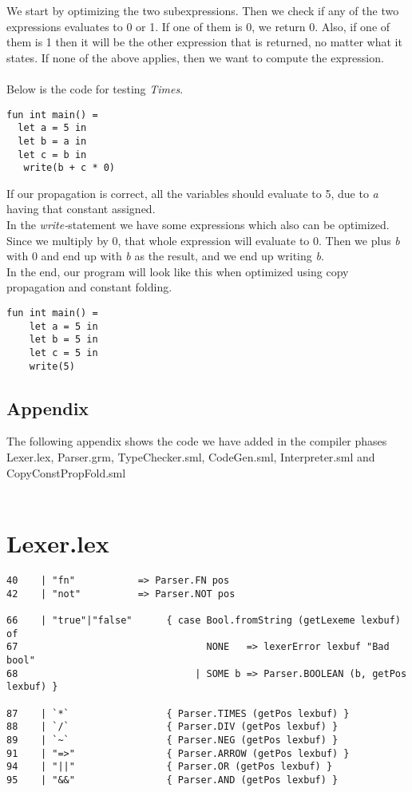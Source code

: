 \documentclass[paper=a4, fontsize=11pt]{scrartcl} %
\numberwithin{equation}{section} %
\numberwithin{figure}{section} %
\numberwithin{table}{section} %
\begin{document}
We start by optimizing the two subexpressions. Then we check if any of the two expressions evaluates to 0 or 1. If one of them is 0, we return 0. Also, if one of them is 1 then it will be the other expression that is returned, no matter what it states. If none of the above applies, then we want to compute the expression.\\\\
Below is the code for testing \textit{Times}. 
\begin{lstlisting}
fun int main() = 
  let a = 5 in
  let b = a in
  let c = b in
   write(b + c * 0)
\end{lstlisting}
If our propagation is correct, all the variables should evaluate to 5, due to \textit{a} having that constant assigned.\\
In the \textit{write-}statement we have some expressions which also can be optimized. Since we multiply by 0, that whole expression will evaluate to 0. Then we plus \textit{b} with 0 and end up with \textit{b} as the result, and we end up writing \textit{b}.\\
In the end, our program will look like this when optimized using copy propagation and constant folding.
\begin{lstlisting}
fun int main() =  
    let a = 5 in    
    let b = 5 in    
    let c = 5 in
    write(5)
\end{lstlisting}

\pagebreak

\section*{Appendix}

\appendix
The following appendix shows the code we have added in the compiler phases Lexer.lex, Parser.grm, TypeChecker.sml, CodeGen.sml, Interpreter.sml and CopyConstPropFold.sml\\\\

\chapter{Lexer.lex}

\begin{lstlisting}
40	  | "fn"           => Parser.FN pos 
42	  | "not"          => Parser.NOT pos

66	  | "true"|"false"      { case Bool.fromString (getLexeme lexbuf) of 
67	                               NONE   => lexerError lexbuf "Bad bool" 
68	                             | SOME b => Parser.BOOLEAN (b, getPos lexbuf) }

87	  | `*`                 { Parser.TIMES (getPos lexbuf) } 
88	  | `/`                 { Parser.DIV (getPos lexbuf) } 
89	  | `~`                 { Parser.NEG (getPos lexbuf) }
91	  | "=>"                { Parser.ARROW (getPos lexbuf) } 
94	  | "||"                { Parser.OR (getPos lexbuf) } 
95	  | "&&"                { Parser.AND (getPos lexbuf) } 
\end{lstlisting}
\end{document}
